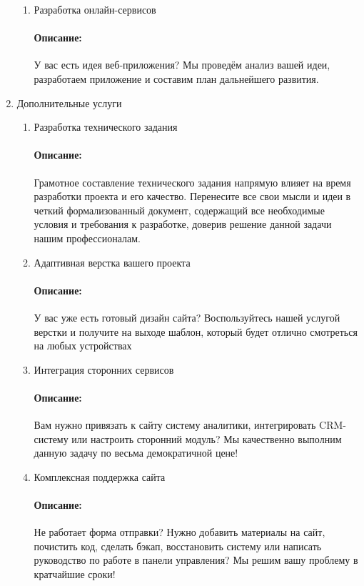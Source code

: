 \begin{enumerate}
\begin{enumerate}
    \item Разработка онлайн-сервисов \paragraph{Описание:} У вас есть идея веб-приложения? Мы проведём анализ вашей идеи, разработаем приложение и составим план дальнейшего развития.
  \end{enumerate}

  \item Дополнительные услуги
  \begin{enumerate}
    \item Разработка технического задания
      \paragraph{Описание:} Грамотное составление технического задания напрямую влияет на время разработки проекта и его качество. Перенесите все свои мысли и идеи в четкий формализованный документ, содержащий все необходимые условия и требования к разработке, доверив решение данной задачи нашим профессионалам.
    \item Адаптивная верстка вашего проекта
      \paragraph{Описание:} У вас уже есть готовый дизайн сайта? Воспользуйтесь нашей услугой верстки и получите на выходе шаблон, который будет отлично смотреться на любых устройствах
    \item Интеграция сторонних сервисов
      \paragraph{Описание:} Вам нужно привязать к сайту систему аналитики, интегрировать CRM-систему или настроить сторонний модуль? Мы качественно выполним данную задачу по весьма демократичной цене!
    \item Комплексная поддержка сайта
      \paragraph{Описание:} Не работает форма отправки? Нужно добавить материалы на сайт, почистить код, сделать бэкап, восстановить систему или написать руководство по работе в панели управления? Мы решим вашу проблему в кратчайшие сроки!
  \end{enumerate}

\end{enumerate}

